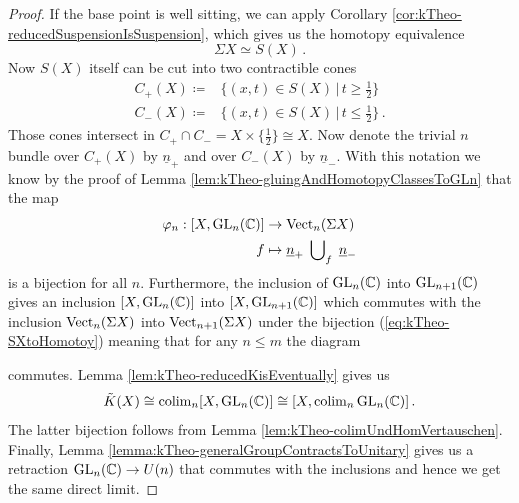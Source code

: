 \begin{proof}
	If the base point is well sitting, we can apply Corollary \ref{cor:kTheo-reducedSuspensionIsSuspension}, which gives us the homotopy equivalence
	\begin{equation*}
		\Sigma X \simeq S(X)\,.
	\end{equation*} Now $S(X)$ itself can be cut into two contractible cones 
	\begin{equation*}
		\begin{array}{ll}
			C_+(X) \coloneq & \{(x,t)\in S(X) \,|\, t\geq \frac{1}{2} \}\\
			C_-(X) \coloneq & \{(x,t)\in S(X) \,|\, t\leq \frac{1}{2} \} \,.	
		\end{array} 
	\end{equation*}
	Those cones intersect in $C_+\cap C_-= X\times \{\frac{1}{2}\}\cong X$. Now denote the trivial $n$ bundle over $C_+(X)$ by $\underline{n}_+$ and over $C_-(X)$ by $\underline{n}_-$. With this notation we know by the proof of Lemma \ref{lem:kTheo-gluingAndHomotopyClassesToGLn} that the map
	\begin{align}\label{eq:kTheo-SXtoHomotoy}
		\varphi_n: [X,\mathrm{GL}_n(\mathbb{C})]&\to \operatorname{\mathrm{Vect}}_n(\Sigma X)\\
		f&\mapsto \underline{n}_+ \; \bigcup\nolimits_{f} \; \underline{n}_- \nonumber
	\end{align} is a bijection for all $n$. Furthermore, the inclusion of $\mathrm{GL}_n(\mathbb{C})$ into $\mathrm{GL}_{n+1}(\mathbb{C})$ gives an inclusion $[X,\mathrm{GL}_n(\mathbb{C})]$  into $[X,\mathrm{GL}_{n+1}(\mathbb{C})]$ which commutes with the inclusion $\operatorname{\mathrm{Vect}}_n(\Sigma X)$ into $\operatorname{\mathrm{Vect}}_{n+1}(\Sigma X)$ under the bijection (\ref{eq:kTheo-SXtoHomotoy}) meaning that for any $n\leq m$ the diagram
	\begin{center}
\end{center}commutes. Lemma \ref{lem:kTheo-reducedKisEventually} gives us 
	\begin{equation*}
		\tilde{K}(X)\cong \operatorname{\mathrm{colim}}_n [X,\mathrm{GL}_n(\mathbb{C})]\cong [X,\operatorname{\mathrm{colim}}_n\mathrm{GL}_n(\mathbb{C})]\,.
	\end{equation*} The latter bijection follows from Lemma \ref{lem:kTheo-colimUndHomVertauschen}.
	Finally, Lemma \ref{lemma:kTheo-generalGroupContractsToUnitary} gives us a retraction $\mathrm{GL}_n(\mathbb{C}) \to U(n)$ that commutes with the inclusions and hence we get the same direct limit.

\end{proof}

